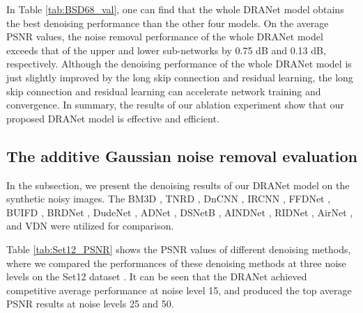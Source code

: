 \documentclass[3p,times]{elsarticle}
\begin{document}
In Table \ref{tab:BSD68_val}, one can find that the whole DRANet model obtains the best denoising performance than the other four models. On the average PSNR values, the noise removal performance of the whole DRANet model exceeds that of the upper and lower sub-networks by 0.75 dB and 0.13 dB, respectively. Although the denoising performance of the whole DRANet model is just slightly improved by the long skip connection and residual learning, the long skip connection and residual learning can accelerate network training and convergence. In summary, the results of our ablation experiment show that our proposed DRANet model is effective and efficient.

\subsection{The additive Gaussian noise removal evaluation}
In the subsection, we present the denoising results of our DRANet model on the synthetic noisy images. The BM3D \cite{Dabov2007}, TNRD \cite{Chen2017}, DnCNN \cite{Zhang2017}, IRCNN \cite{ZhangZGZ2017}, FFDNet \cite{Zhang2018}, BUIFD \cite{Helou2020}, BRDNet \cite{Tian2020}, DudeNet \cite{Tian2021}, ADNet \cite{TianX2020}, DSNetB \cite{Peng2019}, AINDNet \cite{Kim2020}, RIDNet \cite{Anwar2019}, AirNet \cite{Li2022}, and VDN \cite{Yue2019} were utilized for comparison.

Table \ref{tab:Set12_PSNR} shows the PSNR values of different denoising methods, where we compared the performances of these denoising methods at three noise levels on the Set12 dataset \cite{Roth2005}. It can be seen that the DRANet achieved competitive average performance at noise level 15, and produced the top average PSNR results at noise levels 25 and 50.
\end{document}
